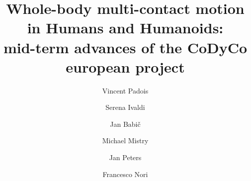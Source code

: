 \documentclass[final,5p,twocolumn]{elsarticle}
\begin{document}
\begin{frontmatter}



\title{Whole-body multi-contact motion in Humans and Humanoids:\\mid-term advances of the CoDyCo european project}


\author{Vincent Padois}
\address{Sorbonne Universit\'{e}s, UPMC Univ Paris 06, UMR 7222, Institut des Syst\`{e}mes Intelligents et de Robotique, Paris, France.\\CNRS, UMR 7222, Institut des Syst\`{e}mes Intelligents et de Robotique, Paris, France. Email: vincent.padois@upmc.fr}

\author{Serena Ivaldi}
\address{Inria, Villers-l\`{e}s-Nancy, France.\\
CNRS  \& Universit\'e de Lorraine, UMR 7503, Loria, Vandoeuvre-l\`{e}s-Nancy, France. Email: serena.ivaldi@inria.fr}

\author{Jan Babi\v{c}}
\address{Jo\v{z}ef Stefan Institute, Ljubljana, Slovenia. Email: jan.babic@ijs.si}

\author{Michael Mistry }
\address{University of Birmingham, Birmingham, United Kingdom. Email: m.n.mistry@bham.ac.uk}

\author{Jan Peters}
\address{Max Planck Institute for Intelligent Systems and TU Darmstadt, Darmstadt, Germany. Email: mail@jan-peters.net}

\author{Francesco Nori}
\address{Robotics, Brain and Cognitive Science Department, Istituto Italiano di Tecnologia, Genova, Italy. Email: francesco.nori@iit.it}



\end{frontmatter}
\end{document}
